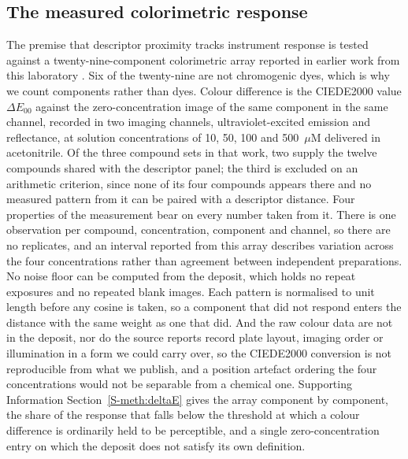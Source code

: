 \documentclass[journal=ancham,manuscript=article,margin=1in]{achemso}
\begin{document}
\subsection{The measured colorimetric response}
\label{meth:array}
The premise that descriptor proximity tracks instrument response is tested
against a twenty-nine-component colorimetric array reported in earlier work
from this laboratory \cite{hazref,multiplexref,group3ref}. Six of the
twenty-nine are not chromogenic dyes, which is why we count components rather
than dyes. Colour difference is the CIEDE2000 value $\Delta E_{00}$ against the
zero-concentration image of the same component in the same channel, recorded in
two imaging channels, ultraviolet-excited emission and reflectance, at solution
concentrations of 10, 50, 100 and 500~$\mu$M delivered in acetonitrile. Of the
three compound sets in that work, two supply the twelve compounds shared with
the descriptor panel; the third is excluded on an arithmetic criterion, since
none of its four compounds appears there and no measured pattern from it can be
paired with a descriptor distance. Four properties of the measurement bear on
every number taken from it. There is one observation per compound, concentration, component and channel,
so there are no replicates, and an interval reported from this array describes
variation across the four concentrations rather than agreement between
independent preparations. No noise floor can be computed from the deposit,
which holds no repeat exposures and no repeated blank images. Each pattern
is normalised to unit length before any cosine is taken, so a component that
did not respond enters the distance with the same weight as one that did. And
the raw colour data are not in the deposit, nor do the source reports record
plate layout, imaging order or illumination in a form we could carry over, so
the CIEDE2000 conversion is not reproducible from what we publish, and a
position artefact ordering the four concentrations would not be separable from
a chemical one.
Supporting Information Section~\ref{S-meth:deltaE} gives the array component by
component, the share of the response that falls below the threshold at which a
colour difference is ordinarily held to be perceptible, and a single
zero-concentration entry on which the deposit does not satisfy its own
definition.
\end{document}
